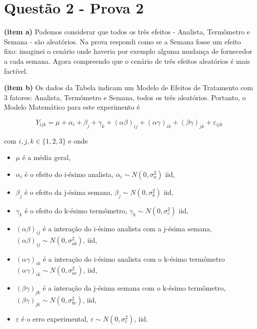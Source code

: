 \documentclass[12pt]{article}
\begin{document}
 

\section*{Questão 2 - Prova 2}  

	\textbf{(item a)} Podemos considerar que todos os três efeitos - Analista, Termômetro e Semana - são aleatórios. Na prova respondi como se a Semana fosse um efeito fixo: imaginei o cenário onde haveria por exemplo alguma mudança de fornecedor a cada semana. Agora compreendo que o cenário de três efeitos aleatórios é mais factível.

\textbf{(item b)} Os dados da Tabela indicam um Modelo de Efeitos de Tratamento com 3 fatores: Analista, Termômetro e Semana, todos os três aleatórios. Portanto, o Modelo Matemático para este experimento é 

$$Y_{ijk} = \mu + \alpha_i + \beta_j + \gamma_k + (\alpha\beta)_{ij} + (\alpha\gamma)_{ik} + (\beta\gamma)_{jk} + \varepsilon_{ijk}$$

com $i,j,k \in \{1,2,3\}$ e onde

\begin{itemize}
\item $\mu$ é a média geral,
\item $\alpha_i$ é o efeito do i-ésimo analista, $\alpha_i \sim N(0, \sigma_a^2)$ iid,
\item $\beta_j$ é o efeito da j-ésima semana, $\beta_j \sim N(0, \sigma_b^2)$ iid,
\item $\gamma_k$ é o efeito do k-ésimo termômetro, $\gamma_k \sim N(0, \sigma_c^2)$ iid,
\item $(\alpha\beta)_{ij}$ é a interação do i-ésimo analista com a j-ésima semana, $(\alpha\beta)_{ij} \sim N(0, \sigma_{ab}^2)$, iid,
\item $(\alpha\gamma)_{ik}$ é a interação do i-ésimo analista com o k-ésimo termômetro $(\alpha\gamma)_{ik} \sim N(0, \sigma_{ac}^2)$, iid,
\item $(\beta\gamma)_{jk}$ é a interação da j-ésima semana com o k-ésimo termômetro, $(\beta\gamma)_{jk} \sim N(0, \sigma_{bc}^2)$, iid,
\item $\varepsilon$ é o erro experimental, $\varepsilon \sim N(0, \sigma_e^2)$, iid.
\end{itemize}
\end{document}
